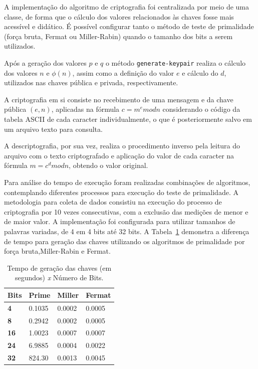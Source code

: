 A implementação do algoritmo de criptografia foi centralizada por meio de uma classe, de forma que o cálculo dos valores relacionados às chaves fosse mais acessível e didático. É possível configurar tanto o método de teste de primalidade (força bruta, Fermat ou Miller-Rabin) quando o tamanho dos bits a serem utilizados.

Após a geração dos valores $p$ e $q$ o método \texttt{generate-keypair} realiza o cálculo dos valores $n$ e $\phi(n)$, assim como a definição do valor $e$ e cálculo do $d$, utilizados nas chaves pública e privada, respectivamente.

A criptografia em si consiste no recebimento de uma mensagem e da chave pública $(e,n)$, aplicadas na fórmula $c = m^e mod n$  considerando o código da tabela ASCII de cada caracter individualmente, o que é posteriormente salvo em um arquivo texto para consulta.

A descriptografia, por sua vez, realiza o procedimento inverso pela leitura do arquivo com o texto criptografado e aplicação do valor de cada caracter na fórmula $m = c^d mod n$, obtendo o valor original.


Para análise do tempo de execução foram realizadas combinações de algoritmos, contemplando diferentes processos para execução do teste de primalidade. A metodologia para coleta de dados consistiu na execução do processo de criptografia por 10 vezes consecutivas, com a exclusão das medições de menor e de maior valor. A implementação foi configurada para utilizar tamanhos de palavras variadas, de 4 em 4 bits até 32 bits. A Tabela~\ref{tab:encryptTable} demonstra a diferença de tempo para geração das chaves utilizando os algoritmos de primalidade por força bruta,Miller-Rabin e Fermat.

\begin{table}[!htbp]
\centering
\caption{Tempo de geração das chaves (em segundos) \textit{x} Número de Bits.}
\label{tab:encryptTable}
\begin{tabular}{|l|l|l|l|}
\hline
\textbf{Bits} & \textbf{Prime} & \textbf{Miller} & \textbf{Fermat} \\ \hline
\textbf{4} & 0.1035 & 0.0002 & 0.0005 \\ \hline
\textbf{8} & 0.2942 & 0.0002 & 0.0005 \\ \hline
\textbf{16} & 1.0023 & 0.0007 & 0.0007 \\ \hline
\textbf{24} & 6.9885 & 0.0004 & 0.0022 \\ \hline
\textbf{32} & 824.30 & 0.0013 & 0.0045 \\ \hline
\end{tabular}
\end{table}


